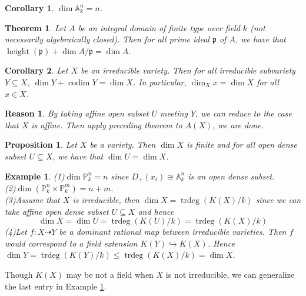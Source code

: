 \documentclass{ctexart}
\newtheorem{theorem}{Theorem}[section]
\newtheorem{proposition}{Proposition}[section]
\newtheorem{reason}{Reason}[section]
\newtheorem{example}{Example}[section]
\newtheorem{corollary}{Corollary}[section]
\newcommand{\trdeg}{\operatorname{trdeg}}
\newcommand{\codim}{\operatorname{codim}}
\newcommand{\height}{\operatorname{height}}
\begin{document}
\begin{corollary}
    $\dim \mathbb{A}_{k}^{n} = n$.
    \label{Corollary 4.2}
\end{corollary}
\begin{theorem}
    Let $A$ be an integral domain of finite type over field $k$ (not necessarily algebraically closed).
    Then for all prime ideal $\mathfrak{p}$ of $A$, we have that $\height (\mathfrak{p}) + \dim A/\mathfrak{p} = \dim A$.
    \label{Theorem 4.2}
\end{theorem}
\vspace{-\baselineskip} %
\begin{corollary}
    Let $X$ be an irreducible variety.
    Then for all irreducible subvariety $Y \subseteq X$, $\dim Y + \codim Y = \dim X$.
    In particular, $\dim_{X} x = \dim X$ for all $x\in X$.
    \label{Corollary 4.3}
\end{corollary}
\begin{reason}
    By taking affine open subset $U$ meeting $Y$, we can reduce to the case that $X$ is affine.
    Then apply preceding theorem to $A(X)$, we are done.
\end{reason}
\begin{proposition}
    Let $X$ be a variety.
    Then $\dim X$ is finite and for all open dense subset $U \subseteq X$, we have that $\dim U = \dim X$.
    \label{Proposition 4.3}
\end{proposition}
\begin{example}
    (1)$\dim \mathbb{P}_{k}^{n} = n$ since $D_{+}(x_{i}) \cong \mathbb{A}_{k}^{n}$ is an open dense subset. \\
    (2)$\dim (\mathbb{P}_{k}^{n} \times \mathbb{P}_{k}^{m}) = n + m$. \\
    (3)Assume that $X$ is irreducible, then $\dim X = \trdeg(K(X)/k)$ since we can take affine open dense subset $U \subseteq X$ and hence
    \begin{equation}
        \dim X = \dim U = \trdeg(K(U)/k) = \trdeg(K(X)/k)
    \end{equation}
    (4)Let $f: X \dashrightarrow Y$ be a dominant rational map between irreducible varieties.
    Then $f$ would correspond to a field extension $K(Y) \hookrightarrow K(X)$.
    Hence $\dim Y = \trdeg (K(Y)/k) \le \trdeg (K(X)/k) = \dim X$.
    \label{example:some_elementary_examples_in_dimension_theory}
\end{example}
Though $K(X)$ may be not a field when $X$ is not irreducible,
we can generalize the last entry in Example \ref{example:some_elementary_examples_in_dimension_theory}.
\end{document}
